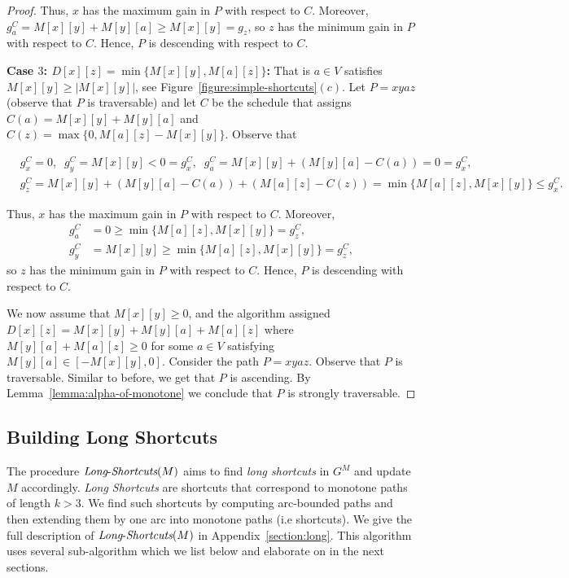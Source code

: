 \documentclass[11pt]{article}
\newcommand{\LS}{\mbox{{\it Long}-{\it Shortcuts}}}
\begin{document}
\begin{proof}
Thus, $x$ has the maximum gain in $P$ with respect to $C$. Moreover, $g^C_a=M[x][y]+M[y][a] \ge M[x][y]=  g_z$, so $z$ has the minimum gain in $P$ with respect to $C$. Hence, $P$ is descending with respect to $C$.

\textbf{Case $3$: $D[x][z] = \min \{M[x][y], M[a][z] \}$:} That is $a\in V$ satisfies $M[x][y] \ge |M[x][y]|$, see Figure~\ref{figure:simple-shortcuts}$(c)$. Let $P = xyaz$ (observe that $P$ is traversable) and let $C$ be the schedule that assigns $C(a) = M[x][y] + M[y][a]$ and $C(z) = \max \{0, M[a][z] - M[x][y] \}$.
Observe that

\begin{align*}
    &g^C_x=0,\;\; g^C_y=M[x][y] < 0 =g^C_x,\;\; g^C_a = M[x][y]+(M[y][a]-C(a)) = 0 = g^C_x,\\
    &g^C_z = M[x][y]+(M[y][a]-C(a))+(M[a][z] - C(z)) = \min \{M[a][z], M[x][y] \} \le g^C_x.
\end{align*}

Thus, $x$ has the maximum gain in $P$ with respect to $C$. Moreover, 
\begin{align*}
g^C_a&= 0 \ge \min \{M[a][z], M[x][y] \} =  g^C_z,\\
g^C_y &= M[x][y] \ge \min \{M[a][z], M[x][y] \} = g^C_z,
\end{align*}
 so $z$ has the minimum gain in $P$ with respect to $C$. Hence, $P$ is descending with respect to $C$.

\medskip

We now assume that $M[x][y]\ge 0$, and the algorithm assigned $D[x][z]=M[x][y]+M[y][a]+M[a][z]$ where $M[y][a]+M[a][z] \ge 0$ for some $a\in V$ satisfying $M[y][a] \in [-M[x][y] , 0]$. Consider the path $P=xyaz$. Observe that $P$ is traversable. Similar to before, we get that $P$ is ascending. By Lemma~\ref{lemma:alpha-of-monotone} we conclude that $P$ is strongly traversable.
\end{proof}

\subsection{Building Long Shortcuts}
The procedure $\LS(M)$ aims to find \emph{long shortcuts} in $G^M$ and update $M$ accordingly. \emph{Long Shortcuts} are shortcuts that correspond to monotone paths of length $k>3$. We find such shortcuts by computing arc-bounded paths and then extending them by one arc into monotone paths (i.e  shortcuts). We give the full description of $\LS(M)$ in Appendix~\ref{section:long}. This algorithm uses several sub-algorithm which we list below and elaborate on in the next sections. 
\end{document}
